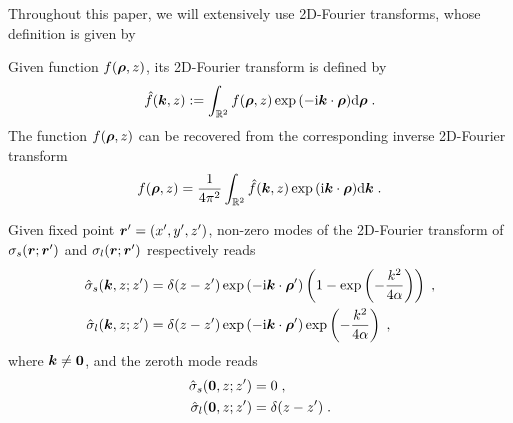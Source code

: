 Throughout this paper, we will extensively use 2D-Fourier transforms, whose definition is given by
\begin{defi}
Given function $f(\bm{\rho}, z)$, its 2D-Fourier
transform is defined by
  \begin{equation} 
\Hat{f}(\bm{k}, z):=\int_{\mathbb{R}^2}f(\bm{\rho},z)\exp{(-\mathrm{i} \boldsymbol{k} \cdot \boldsymbol{\rho})} \mathrm{d} \bm{\rho} \;.
\end{equation}
The function  $f(\bm{\rho}, z)$ can be  recovered from the corresponding inverse 2D-Fourier transform
  \begin{equation} 
{f}(\bm{\rho}, z)=\frac{1}{4\pi^2}\int_{\mathbb{R}^2}\Hat{f}(\bm{k}, z)\exp{(\mathrm{i} \boldsymbol{k} \cdot \boldsymbol{\rho})} \mathrm{d} \bm{k} \;.
\end{equation}
\end{defi} 
\begin{prop}
Given  fixed point     $\boldsymbol{r}^\prime=(x^{\prime}, y^{\prime},z^{\prime})$,    non-zero modes of the 2D-Fourier
transform  of  $ \sigma_{s}(\boldsymbol{r};\bm{r}^\prime)$ and   $\sigma_{l}(\boldsymbol{r};\bm{r}^\prime)$  respectively reads
\begin{align*}
 \Hat{\sigma}_{s}(\bm{k},z;z^\prime) &= \delta(z-z^\prime) \exp{(-\mathrm{i} \boldsymbol{k} \cdot \boldsymbol{\rho}^\prime)}\left(1-\exp\left(-\frac{k^2}{4\alpha}\right)\right)\;,  \\
 \Hat{\sigma}_{l}(\bm{k},z;z^\prime) &= \delta(z-z^\prime) \exp{(-\mathrm{i} \boldsymbol{k} \cdot \boldsymbol{\rho}^\prime)}\exp\left(-\frac{k^2}{4\alpha}\right)\;,
\end{align*}   
where $\bm{k}\neq\bm{0}$, and the zeroth mode reads
\begin{align*}
 \Hat{\sigma}_{s}(\bm{0},z;z^\prime) &= 0\;,  \\
 \Hat{\sigma}_{l}(\bm{0},z;z^\prime) &= \delta(z-z^\prime)\;.
\end{align*}   
\end{prop}
